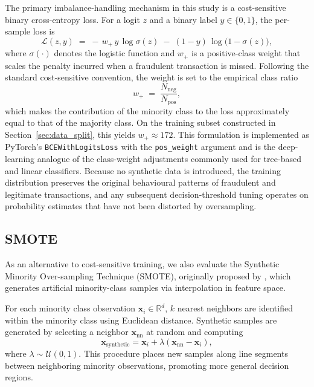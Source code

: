 \documentclass[oneside,12pt,parskip=half,american,numbers=noenddot]{scrreprt}
\begin{document}
The primary imbalance-handling mechanism in this study is a cost-sensitive binary cross-entropy loss. For a logit $z$ and a binary label $y \in \{0, 1\}$, the per-sample loss is
\begin{equation}
\mathcal{L}(z, y) \;=\; -\,w_{+}\, y \,\log \sigma(z) \;-\; (1 - y)\, \log\!\big(1 - \sigma(z)\big),
\end{equation}
where $\sigma(\cdot)$ denotes the logistic function and $w_{+}$ is a positive-class weight that scales the penalty incurred when a fraudulent transaction is missed. Following the standard cost-sensitive convention, the weight is set to the empirical class ratio
\begin{equation}
w_{+} \;=\; \frac{N_{\text{neg}}}{N_{\text{pos}}},
\end{equation}
which makes the contribution of the minority class to the loss approximately equal to that of the majority class. On the training subset constructed in Section~\ref{sec:data_split}, this yields $w_{+} \approx 172$. This formulation is implemented as PyTorch's \texttt{BCEWithLogitsLoss} with the \texttt{pos\_weight} argument and is the deep-learning analogue of the class-weight adjustments commonly used for tree-based and linear classifiers. Because no synthetic data is introduced, the training distribution preserves the original behavioural patterns of fraudulent and legitimate transactions, and any subsequent decision-threshold tuning operates on probability estimates that have not been distorted by oversampling.

\subsection{SMOTE}
\label{subsec:smote_method}

As an alternative to cost-sensitive training, we also evaluate the Synthetic Minority Over-sampling Technique (SMOTE), originally proposed by \textcite{chawla_smote_2002}, which generates artificial minority-class samples via interpolation in feature space.

For each minority class observation $\mathbf{x}_i \in \mathbb{R}^d$, $k$ nearest neighbors are identified within the minority class using Euclidean distance. Synthetic samples are generated by selecting a neighbor $\mathbf{x}_{\text{nn}}$ at random and computing
\begin{equation}
\mathbf{x}_{\text{synthetic}} = \mathbf{x}_i + \lambda \left( \mathbf{x}_{\text{nn}} - \mathbf{x}_i \right),
\end{equation}
where $\lambda \sim \mathcal{U}(0,1)$. This procedure places new samples along line segments between neighboring minority observations, promoting more general decision regions.
\end{document}
